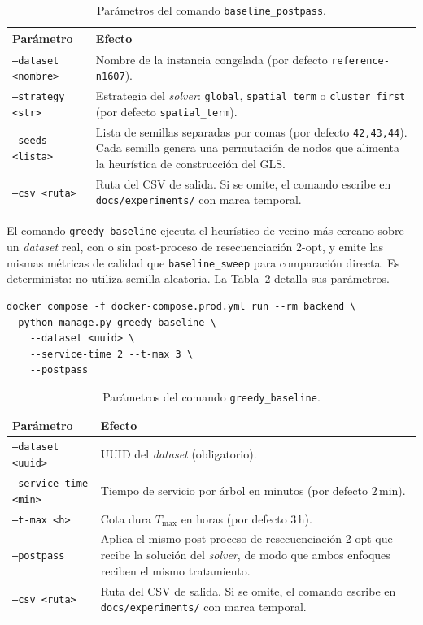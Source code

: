 \begin{table}[H]
  \centering
  \caption{Parámetros del comando \texttt{baseline\_postpass}.}
  \label{tab:anexo_baseline_postpass}
  \small
  \begin{tabularx}{\textwidth}{@{}p{5.5cm} X@{}}
    \toprule
    Parámetro & Efecto \\
    \midrule
    \texttt{--dataset <nombre>}   & Nombre de la instancia congelada (por defecto \texttt{reference-n1607}). \\
    \texttt{--strategy <str>}     & Estrategia del \textit{solver}: \texttt{global}, \texttt{spatial\_term} o \texttt{cluster\_first} (por defecto \texttt{spatial\_term}). \\
    \texttt{--seeds <lista>}      & Lista de semillas separadas por comas (por defecto \texttt{42,43,44}). Cada semilla genera una permutación de nodos que alimenta la heurística de construcción del GLS. \\
    \texttt{--csv <ruta>}         & Ruta del CSV de salida. Si se omite, el comando escribe en \texttt{docs/experiments/} con marca temporal. \\
    \bottomrule
  \end{tabularx}
\end{table}

El comando \texttt{greedy\_baseline} ejecuta el heurístico de vecino más cercano
sobre un \textit{dataset} real, con o sin post-proceso de resecuenciación 2-opt, y
emite las mismas métricas de calidad que \texttt{baseline\_sweep} para comparación
directa. Es determinista: no utiliza semilla aleatoria. La
Tabla~\ref{tab:anexo_greedy_baseline} detalla sus parámetros.

\begin{verbatim}
docker compose -f docker-compose.prod.yml run --rm backend \
  python manage.py greedy_baseline \
    --dataset <uuid> \
    --service-time 2 --t-max 3 \
    --postpass
\end{verbatim}

\begin{table}[H]
  \centering
  \caption{Parámetros del comando \texttt{greedy\_baseline}.}
  \label{tab:anexo_greedy_baseline}
  \small
  \begin{tabularx}{\textwidth}{@{}p{5.5cm} X@{}}
    \toprule
    Parámetro & Efecto \\
    \midrule
    \texttt{--dataset <uuid>}     & UUID del \textit{dataset} (obligatorio). \\
    \texttt{--service-time <min>} & Tiempo de servicio por árbol en minutos (por defecto $2$\,min). \\
    \texttt{--t-max <h>}          & Cota dura $T_{\max}$ en horas (por defecto $3$\,h). \\
    \texttt{--postpass}           & Aplica el mismo post-proceso de resecuenciación 2-opt que recibe la solución del \textit{solver}, de modo que ambos enfoques reciben el mismo tratamiento. \\
    \texttt{--csv <ruta>}         & Ruta del CSV de salida. Si se omite, el comando escribe en \texttt{docs/experiments/} con marca temporal. \\
    \bottomrule
  \end{tabularx}
\end{table}

